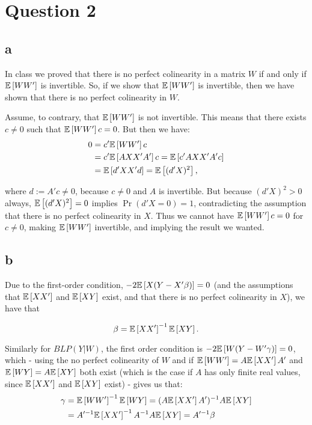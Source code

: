 \documentclass[12pt]{paper}
\begin{document}
\section*{Question 2}

\subsection*{a}

In class we proved that there is no perfect colinearity in a matrix $W$ if and only if $\mathbb{E} \left [ WW' \right ]$ is invertible. So, if we show that $\mathbb{E} \left [ WW' \right ]$ is invertible, then we have shown that there is no perfect colinearity in $W$.

Assume, to contrary, that $\mathbb{E} \left [ WW' \right ]$ is not invertible. This means that there exists $c\ne0$ such that $\mathbb{E} \left [ WW' \right ]c=0$. But then we have:
\begin{equation}
\begin{split}
0&=c'\mathbb{E} \left [ WW' \right ]c\\
&=c'\mathbb{E} \left [ AXX'A' \right ]c=\mathbb{E} \left [ c'AXX'A'c \right ]\\
&=\mathbb{E} \left [ d'XX'd \right ]=\mathbb{E} \left [ (d'X)^2 \right ],
\end{split}
\end{equation}

\noindent where $d:=A'c\ne0$, because $c\ne0$ and $A$ is invertible. But because $(d'X)^2>0$ always, $\mathbb{E} \left [ (d'X)^2 \right ]=0$ implies $\Pr(d'X=0)=1$, contradicting the assumption that there is no perfect colinearity in $X$. Thus we cannot have $\mathbb{E} \left [ WW' \right ]c=0$ for $c\ne0$, making $\mathbb{E} \left [ WW' \right ]$ invertible, and implying the result we wanted.

\subsection*{b}

Due to the first-order condition, $-2\mathbb{E} \left [ X(Y-X'\beta) \right ]=0$ (and the assumptions that $\mathbb{E} \left [ XX' \right ]$ and $\mathbb{E} \left [ XY \right ]$ exist, and that there is no perfect colinearity in $X$), we have that 

\begin{equation}
\beta=\mathbb{E} \left [ XX' \right ]^{-1}\mathbb{E} \left [ XY \right ].
\end{equation}

Similarly for $BLP(Y|W)$, the first order condition is $-2\mathbb{E} \left [ W(Y-W'\gamma) \right ]=0$, which - using the no perfect colinearity of $W$ and if $\mathbb{E} \left [ WW' \right ]=A\mathbb{E} \left [ XX' \right ]A'$ and $\mathbb{E} \left [ WY \right ]=A\mathbb{E} \left [ XY \right ]$ both exist (which is the case if $A$ has only finite real values, since $\mathbb{E} \left [ XX' \right ]$ and $\mathbb{E} \left [ XY \right ]$ exist) -  gives us that:
\begin{equation}
\begin{split}
\gamma&=\mathbb{E} \left [ WW' \right ]^{-1}\mathbb{E} \left [ WY \right ]=(A\mathbb{E} \left [ XX' \right ]A')^{-1}A\mathbb{E} \left [ XY \right ]\\
&=A'^{-1}\mathbb{E} \left [ XX' \right ]^{-1}A^{-1}A\mathbb{E} \left [ XY \right ]=A'^{-1}\beta
\end{split}
\end{equation}
\end{document}
